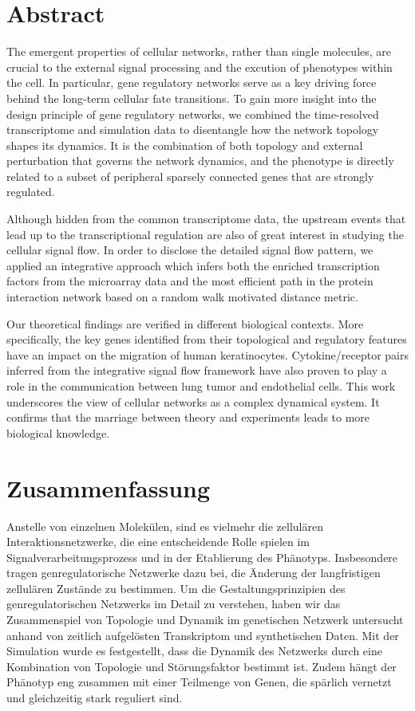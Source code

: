 \chapter*{Abstract}


The emergent properties of cellular networks, rather than single molecules, 
are crucial to the external signal processing and the excution of phenotypes
within the cell. In particular, gene regulatory networks serve as a key
driving force behind the long-term cellular fate transitions. To gain more
insight into the design principle of gene regulatory networks, we combined
the time-resolved transcriptome and simulation data to disentangle how the
network topology shapes its dynamics. It is the combination of both topology
and external perturbation that governs the network dynamics, and 
the phenotype is directly related to a subset of
peripheral sparsely connected genes that are strongly regulated. 

Although hidden from the common transcriptome data, 
the upstream events that lead up to the 
transcriptional regulation are also of great interest in studying the 
cellular signal flow. In order to disclose the detailed signal flow pattern,
we applied an integrative approach which infers both the enriched 
transcription factors from the microarray data and the most efficient path
in the protein interaction network based on a random walk motivated distance
metric.

Our theoretical findings are verified in different biological contexts. More
specifically, the key genes identified from their topological and regulatory
features have an impact on the migration of human keratinocytes. 
Cytokine/receptor pairs inferred from the integrative signal flow framework
have also proven to play a role in the communication between lung tumor
and endothelial cells. This work underscores the view of
cellular networks as a complex dynamical system.
It confirms that the marriage between theory
and experiments leads to more biological knowledge.

\chapter*{Zusammenfassung}


Anstelle von einzelnen Molek\"ulen,
sind es vielmehr die zellul\"aren Interaktionsnetzwerke,
die eine entscheidende Rolle spielen im 
Signalverarbeitungsprozess und in der Etablierung des
Ph\"anotyps. Insbesondere tragen genregulatorische Netzwerke
dazu bei, die \"Anderung der langfristigen zellul\"aren
Zust\"ande zu bestimmen. Um die Gestaltungsprinzipien des
genregulatorischen Netzwerks im
Detail zu verstehen, haben wir das Zusammenspiel von Topologie
und Dynamik im genetischen Netzwerk untersucht anhand von
zeitlich aufgel\"osten Transkriptom und synthetischen
Daten. Mit der Simulation wurde es festgestellt, dass
die Dynamik des Netzwerks durch eine Kombination von
Topologie und St\"orungsfaktor bestimmt ist.
Zudem h\"angt der Ph\"anotyp eng zusammen mit einer Teilmenge
von Genen, die sp\"arlich vernetzt und gleichzeitig
stark reguliert sind. 

